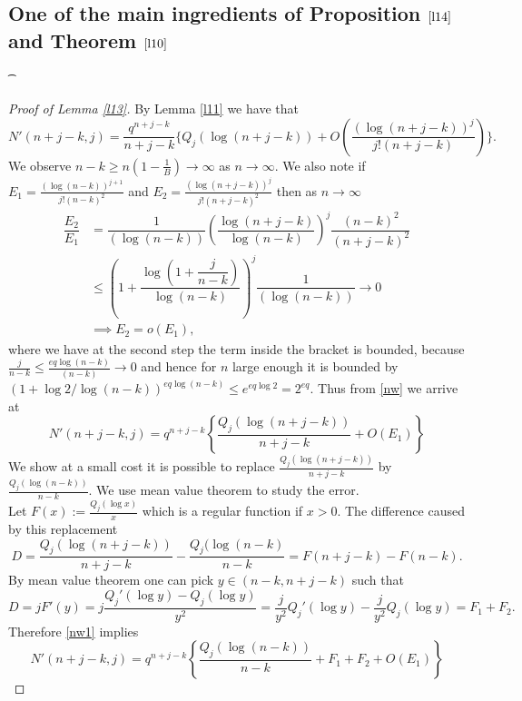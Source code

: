 \documentclass[12pt]{amsart}
\numberwithin{equation}{section}
\theoremstyle{remark}
\theoremstyle{remark}
\theoremstyle{definition}
\begin{document}
\subsection{One of the main ingredients of Proposition $\ref{l14}$ and Theorem $\ref{l10}$}
\t*
\begin{proof}[Proof of Lemma \ref{l13}]\label{lm}
\label{Proof of Lemma 4.4}
By Lemma \ref{l11} we have that
\begin{equation}\label{nw}
N'(n+j-k,j)=\dfrac{q^{n+j-k}}{n+j-k}\Bigg \{Q_j(\log (n+j-k))+ O \left( \dfrac{(\log (n+j-k))^j}{j!(n+j-k)}\right) \Bigg \}.
\end{equation}
We observe $n-k\geqslant n\left(1-\frac{1}{B}\right)\to\infty$ as $n\to\infty$. We also note if $E_1=\frac{(\log (n-k))^{j+1}}{j!(n-k)^2}$ and $E_2=\frac{(\log (n+j-k))^j}{j!(n+j-k)^2}$ then as $n\to\infty$
\begin{align}
\nonumber
\dfrac{E_2}{E_1} &= \dfrac{1}{(\log (n-k))}\left (\dfrac{\log (n+j-k)}{\log (n-k)} \right)^j \dfrac{(n-k)^2}{(n+j-k)^2}\\
\nonumber
&\leqslant\left( 1+ \dfrac{\log\left(1+\dfrac{j}{n-k}\right)}{\log(n-k)}\right)^j\dfrac{1}{(\log(n-k))}\to 0\\
\nonumber
&\implies E_2=o(E_1),
\end{align}
where we have at the second step the term inside the bracket is bounded, because $\frac{j}{n-k}\leqslant \frac{eq\log(n-k)}{(n-k)}\to 0$ and hence for $n$ large enough it is bounded by $(1+\log 2/\log(n-k))^{eq\log(n-k)} \leqslant e^{eq\log 2}=2^{eq}$. Thus from \eqref{nw} we arrive at
\begin{equation}\label{nw1}
    N'(n+j-k,j)=q^{n+j-k}\left \{\dfrac{Q_j(\log (n+j-k))}{n+j-k}+ O \left( E_1\right)\right \}
\end{equation}
We show at a small cost it is possible to replace $\frac{Q_j(\log (n+j-k))}{n+j-k}$ by $\frac{Q_j(\log (n-k))}{n-k}$.
We use mean value theorem to study the error.\\
Let $F(x):=\frac{Q_j(\log x)}{x}$ which is a regular function if $x>0$. The difference caused by this replacement
$$D=\dfrac{Q_j(\log (n+j-k))}{n+j-k}-\dfrac{Q_j(\log (n-k)}{n-k}=F(n+j-k)-F(n-k).$$
By mean value theorem one can pick $y\in (n-k,n+j-k)$ such that
$$D=jF'(y)=j\dfrac{Q_j'(\log y)-Q_j(\log y)}{y^2}=\dfrac{j}{y^2}Q_j'(\log y)-\dfrac{j}{y^2}Q_j(\log y)=F_1+F_2.$$
Therefore \eqref{nw1} implies
\begin{equation}\label{nw2}
     N'(n+j-k,j)=q^{n+j-k}\left \{\frac{Q_j(\log (n-k))}{n-k}+ F_1+F_2+O \left( E_1\right)\right \}

\end{equation}
\end{proof}
\end{document}
